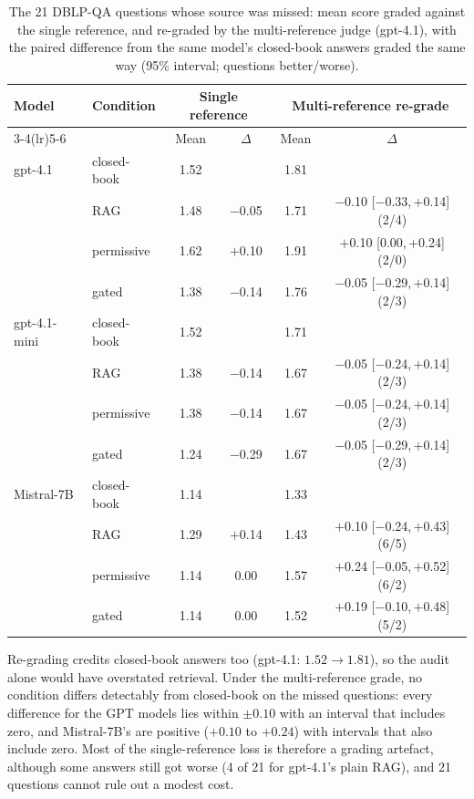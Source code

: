 \documentclass[conference]{IEEEtran}
\newcommand{\ci}[2]{{\scriptsize[#1,\,#2]}}
\newcommand{\dq}{DBLP-QA}
\begin{document}
\begin{table}[t]
\caption{The 21 \dq{} questions whose source was missed: mean score graded against the single reference,
and re-graded by the multi-reference judge (gpt-4.1), with the paired difference from the same model's
closed-book answers graded the same way (95\% interval; questions better/worse).}
\label{tab:missed}
\centering\small
\begin{tabular}{llcccc}
\toprule
Model & Condition & \multicolumn{2}{c}{Single reference} & \multicolumn{2}{c}{Multi-reference re-grade} \\
\cmidrule(lr){3-4}\cmidrule(lr){5-6}
 & & Mean & $\Delta$ & Mean & $\Delta$ \\
\midrule
gpt-4.1 & closed-book & 1.52 & & 1.81 & \\
 & RAG & 1.48 & $-$0.05 & 1.71 & $-$0.10 \ci{$-$0.33}{$+$0.14} (2/4) \\
 & permissive & 1.62 & $+$0.10 & 1.91 & $+$0.10 \ci{0.00}{$+$0.24} (2/0) \\
 & gated & 1.38 & $-$0.14 & 1.76 & $-$0.05 \ci{$-$0.29}{$+$0.14} (2/3) \\
\midrule
gpt-4.1-mini & closed-book & 1.52 & & 1.71 & \\
 & RAG & 1.38 & $-$0.14 & 1.67 & $-$0.05 \ci{$-$0.24}{$+$0.14} (2/3) \\
 & permissive & 1.38 & $-$0.14 & 1.67 & $-$0.05 \ci{$-$0.24}{$+$0.14} (2/3) \\
 & gated & 1.24 & $-$0.29 & 1.67 & $-$0.05 \ci{$-$0.29}{$+$0.14} (2/3) \\
\midrule
Mistral-7B & closed-book & 1.14 & & 1.33 & \\
 & RAG & 1.29 & $+$0.14 & 1.43 & $+$0.10 \ci{$-$0.24}{$+$0.43} (6/5) \\
 & permissive & 1.14 & 0.00 & 1.57 & $+$0.24 \ci{$-$0.05}{$+$0.52} (6/2) \\
 & gated & 1.14 & 0.00 & 1.52 & $+$0.19 \ci{$-$0.10}{$+$0.48} (5/2) \\
\bottomrule
\end{tabular}
\end{table}

Re-grading credits closed-book answers too (gpt-4.1: $1.52\rightarrow1.81$), so the audit alone would have
overstated retrieval. Under the multi-reference grade, no condition differs detectably from closed-book on
the missed questions: every difference for the GPT models lies within $\pm0.10$ with an interval that includes
zero, and Mistral-7B's are positive ($+0.10$ to $+0.24$) with intervals that also include zero. Most of the
single-reference loss is therefore a grading artefact, although some answers still got worse (4 of 21 for
gpt-4.1's plain RAG), and 21 questions cannot rule out a modest cost.
\end{document}

